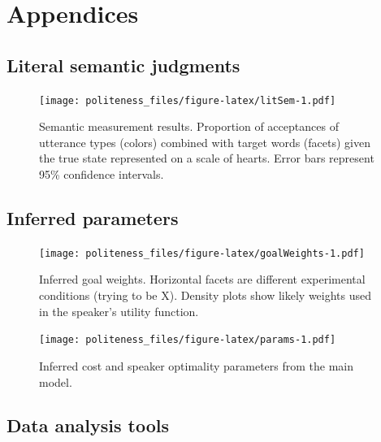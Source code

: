 \documentclass[english,floatsintext,man]{apa6}
\theoremstyle{definition}
\theoremstyle{definition}
\theoremstyle{definition}
\theoremstyle{remark}
\begin{document}
\hypertarget{appendices}{%
\section{Appendices}\label{appendices}}

\hypertarget{literal-semantic-judgments}{%
\subsection{Literal semantic
judgments}\label{literal-semantic-judgments}}

\begin{figure}
\centering
\texttt{[image: politeness\_files/figure-latex/litSem-1.pdf]}
\caption{\label{fig:litSem}Semantic measurement results. Proportion of
acceptances of utterance types (colors) combined with target words
(facets) given the true state represented on a scale of hearts. Error
bars represent 95\% confidence intervals.}
\end{figure}

\hypertarget{inferred-parameters}{%
\subsection{Inferred parameters}\label{inferred-parameters}}

\begin{figure}
\centering
\texttt{[image: politeness\_files/figure-latex/goalWeights-1.pdf]}
\caption{\label{fig:goalWeights}Inferred goal weights. Horizontal facets are
different experimental conditions (trying to be X). Density plots show
likely weights used in the speaker's utility function.}
\end{figure}

\begin{figure}
\centering
\texttt{[image: politeness\_files/figure-latex/params-1.pdf]}
\caption{\label{fig:params}Inferred cost and speaker optimality parameters
from the main model.}
\end{figure}

\hypertarget{data-analysis-tools}{%
\subsection{Data analysis tools}\label{data-analysis-tools}}
\end{document}
